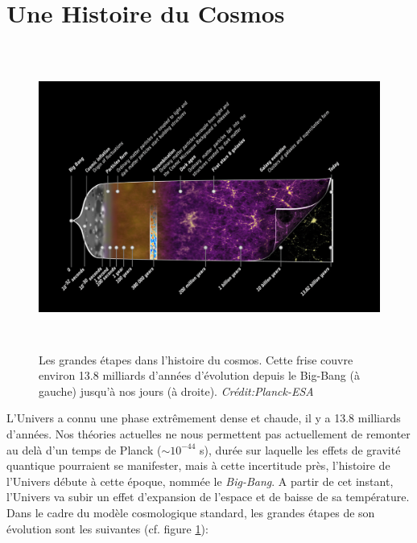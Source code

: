 \section{Une Histoire du Cosmos}
\begin{figure}[htbp]
	\centering
		\includegraphics[height=10cm]{figs/timeline.png}
		\caption{Les grandes étapes dans l'histoire du cosmos. Cette frise couvre environ 13.8 milliards d'années d'évolution depuis le Big-Bang (à gauche) jusqu'à nos jours (à droite). \textit{Crédit:Planck-ESA}}
	\label{f:timeline}
\end{figure}
L'Univers a connu une phase extrêmement dense et chaude, il y a 13.8 milliards d'années. Nos théories actuelles ne nous permettent pas actuellement de remonter au delà d'un temps de Planck ($\sim 10^{-44}$ s), durée sur laquelle les effets de gravité quantique pourraient se manifester, mais à cette incertitude près, l'histoire de l'Univers débute à cette époque, nommée le \textit{Big-Bang}. A partir de cet instant, l'Univers va subir un effet d'expansion de l'espace et de baisse de sa température. Dans le cadre du modèle cosmologique standard, les grandes étapes de son évolution sont les suivantes (cf. figure \ref{f:timeline}):
